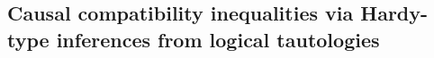 

\subsection{Causal compatibility inequalities via Hardy-type inferences from logical tautologies}\label{sec:TSEM}




